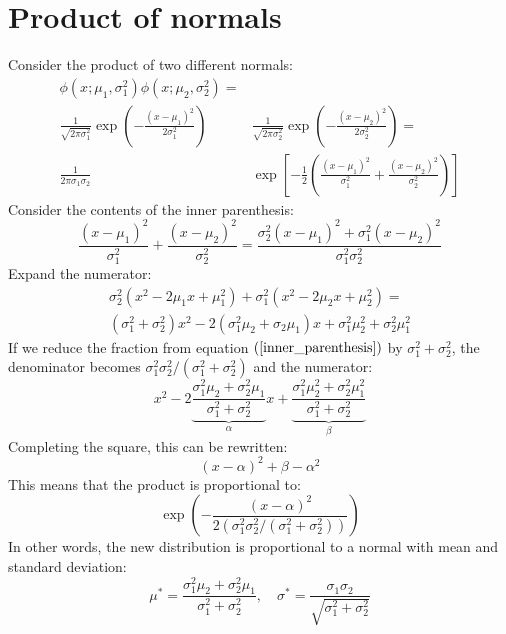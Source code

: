 \documentclass[12pt, a4paper]{article}
\begin{document}
\section{Product of normals}
Consider the product of two different normals:
\begin{align}
\phi(x;\mu_1,\sigma_1^2)\phi(x;\mu_2,\sigma_2^2)=&\\
\frac{1}{\sqrt{2\pi\sigma_1^2}}\exp\left(-\frac{(x-\mu_1)^2}{2\sigma_1^2}\right)&\frac{1}{\sqrt{2\pi\sigma_2^2}}\exp\left(-\frac{(x-\mu_2)^2}{2\sigma_2^2}\right)=\\
\frac{1}{2\pi\sigma_1\sigma_2}&\exp\left[-\frac{1}{2}\left(\frac{(x-\mu_1)^2}{\sigma_1^2}+\frac{(x-\mu_2)^2}{\sigma_2^2}\right)\right]
\end{align}
Consider the contents of the inner parenthesis:
\begin{equation}
\label{inner_parenthesis}
\frac{(x-\mu_1)^2}{\sigma_1^2}+\frac{(x-\mu_2)^2}{\sigma_2^2}=\frac{\sigma_2^2(x-\mu_1)^2+\sigma_1^2(x-\mu_2)^2}{\sigma_1^2\sigma_2^2}
\end{equation}
Expand the numerator:
\begin{align}
\sigma_2^2(x^2-2\mu_1 x+\mu_1^2)+\sigma_1^2(x^2-2\mu_2 x+\mu_2^2)=\\
(\sigma_1^2+\sigma_2^2)x^2-2(\sigma_1^2\mu_2+\sigma_2\mu_1)x+\sigma_1^2\mu_2^2+\sigma_2^2\mu_1^2
\end{align}
If we reduce the fraction from equation $(\ref{inner_parenthesis})$ by $\sigma_1^2+\sigma_2^2$, the denominator becomes $\sigma_1^2\sigma_2^2/(\sigma_1^2+\sigma_2^2)$ and the numerator:
\begin{equation}
x^2-2\underbrace{\frac{\sigma_1^2\mu_2+\sigma_2^2\mu_1}{\sigma_1^2+\sigma_2^2}}_{\alpha}x+\underbrace{\frac{\sigma_1^2\mu_2^2+\sigma_2^2\mu_1^2}{\sigma_1^2+\sigma_2^2}}_{\beta}
\end{equation}
Completing the square, this can be rewritten:
\begin{equation}
(x-\alpha)^2+\beta-\alpha^2
\end{equation}
This means that the product is proportional to:
\begin{equation}
\exp\left(-\frac{(x-\alpha)^2}{2\left(\sigma_1^2\sigma_2^2/(\sigma_1^2+\sigma_2^2)\right)}\right)
\end{equation}
In other words, the new distribution is proportional to a normal with mean and standard deviation:
\begin{equation}
\mu^*=\frac{\sigma_1^2\mu_2+\sigma_2^2\mu_1}{\sigma_1^2+\sigma_2^2},\quad\sigma^*=\frac{\sigma_1\sigma_2}{\sqrt{\sigma_1^2+\sigma_2^2}}
\end{equation}
\end{document}
